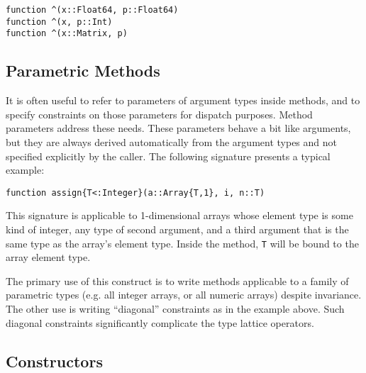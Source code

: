 \documentclass[9pt]{sigplanconf}
\begin{document}
\begin{verbatim}
function ^(x::Float64, p::Float64)
function ^(x, p::Int)
function ^(x::Matrix, p)
\end{verbatim}

\subsection{Parametric Methods}

It is often useful to refer to parameters of argument types inside methods,
and to specify constraints on those parameters for dispatch purposes.
Method parameters address these needs. These parameters behave a bit like
arguments, but they are always derived automatically from
the argument types and not specified explicitly by the caller.
The following signature presents a typical example:

\begin{verbatim}
function assign{T<:Integer}(a::Array{T,1}, i, n::T)
\end{verbatim}

This signature is applicable to 1-dimensional arrays whose element type is
some kind of integer, any type of second argument, and a third argument
that is the same type as the array's element type. Inside the method,
{\tt T} will be bound to the array element type.

The primary use of this construct is to write methods applicable to a
family of parametric types
(e.g. all integer arrays, or all numeric arrays)
despite invariance. The other use is
writing ``diagonal'' constraints as in the example above. Such diagonal
constraints significantly complicate the type lattice operators.







\subsection{Constructors}
\end{document}
